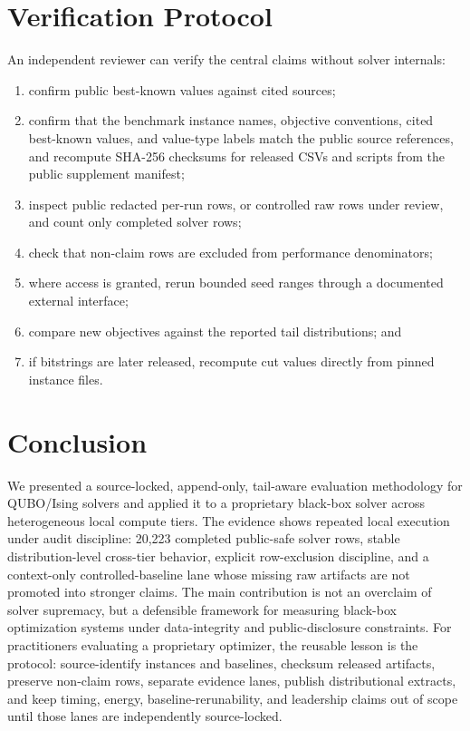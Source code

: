 \documentclass[11pt]{article}
\begin{document}
\section{Verification Protocol}
An independent reviewer can verify the central claims without solver internals:
\begin{enumerate}
  \item confirm public best-known values against cited sources;
  \item confirm that the benchmark instance names, objective conventions, cited best-known values, and value-type labels match the public source references, and recompute SHA-256 checksums for released CSVs and scripts from the public supplement manifest;
  \item inspect public redacted per-run rows, or controlled raw rows under review, and count only completed solver rows;
  \item check that non-claim rows are excluded from performance denominators;
  \item where access is granted, rerun bounded seed ranges through a documented external interface;
  \item compare new objectives against the reported tail distributions; and
  \item if bitstrings are later released, recompute cut values directly from pinned instance files.
\end{enumerate}

\section{Conclusion}
We presented a source-locked, append-only, tail-aware evaluation methodology for QUBO/Ising solvers and applied it to a proprietary black-box solver across heterogeneous local compute tiers. The evidence shows repeated local execution under audit discipline: 20,223 completed public-safe solver rows, stable distribution-level cross-tier behavior, explicit row-exclusion discipline, and a context-only controlled-baseline lane whose missing raw artifacts are not promoted into stronger claims. The main contribution is not an overclaim of solver supremacy, but a defensible framework for measuring black-box optimization systems under data-integrity and public-disclosure constraints. For practitioners evaluating a proprietary optimizer, the reusable lesson is the protocol: source-identify instances and baselines, checksum released artifacts, preserve non-claim rows, separate evidence lanes, publish distributional extracts, and keep timing, energy, baseline-rerunability, and leadership claims out of scope until those lanes are independently source-locked.
\end{document}
